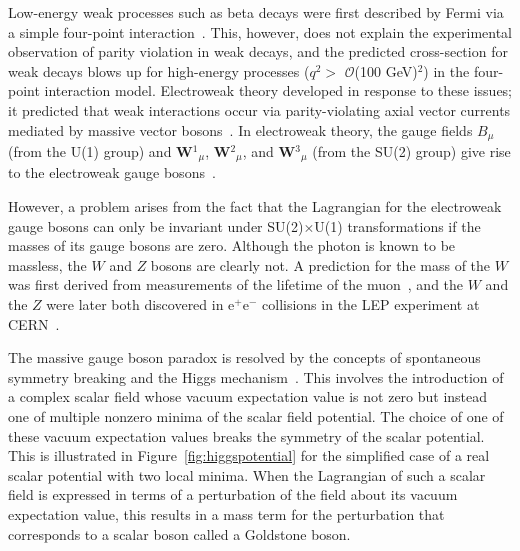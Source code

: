 Low-energy weak processes such as beta decays were first described by Fermi via a simple four-point interaction~\cite{0034-4885-42-12-001}. This, however, does not explain the experimental observation of parity violation in weak decays, and the predicted cross-section for weak decays blows up for high-energy processes ($q^2 >$ $\mathcal{O}$(100 GeV)$^2$) in the four-point interaction model. Electroweak theory developed in response to these issues; it predicted that weak interactions occur via parity-violating axial vector currents mediated by massive vector bosons~\cite{PerkinsPhysics}. In electroweak theory, the gauge fields $B_{\mu}$ (from the U(1) group) and \textbf{W}$^1$$_{\mu}$, \textbf{W}$^2$$_{\mu}$, and \textbf{W}$^3$$_{\mu}$ (from the SU(2) group) give rise to the electroweak gauge bosons~\cite{Bednyakov:2007pz}.

However, a problem arises from the fact that the Lagrangian for the electroweak gauge bosons can only be invariant under SU(2)$\times$U(1) transformations if the masses of its gauge bosons are zero. Although the photon is known to be massless, the $W$ and $Z$ bosons are clearly not. A prediction for the mass of the $W$ was first derived from measurements of the lifetime of the muon~\cite{ThomsonPhysics}, and the $W$ and the $Z$ were later both discovered in e$^{+}$e$^{-}$ collisions in the LEP experiment at CERN~\cite{Arnison:1983rp,Arnison:1983mk}.

The massive gauge boson paradox is resolved by the concepts of spontaneous symmetry breaking and the Higgs mechanism~\cite{ThomsonPhysics}. This involves the introduction of a complex scalar field whose vacuum expectation value is not zero but instead one of multiple nonzero minima of the scalar field potential. The choice of one of these vacuum expectation values breaks the symmetry of the scalar potential. This is illustrated in Figure~\ref{fig:higgspotential} for the simplified case of a real scalar potential with two local minima. When the Lagrangian of such a scalar field is expressed in terms of a perturbation of the field about its vacuum expectation value, this results in a mass term for the perturbation that corresponds to a scalar boson called a Goldstone boson.

